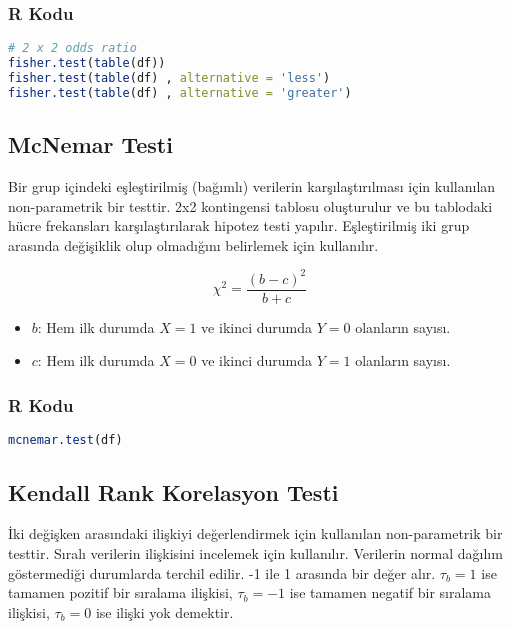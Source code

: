 \subsubsection{R Kodu}

\begin{lstlisting}[language=R]
# 2 x 2 odds ratio
fisher.test(table(df))
fisher.test(table(df) , alternative = 'less')
fisher.test(table(df) , alternative = 'greater')
\end{lstlisting}

\newpage

\subsection{McNemar Testi}
Bir grup içindeki eşleştirilmiş (bağımlı) verilerin karşılaştırılması için kullanılan non-parametrik bir testtir. 2x2 kontingensi tablosu oluşturulur ve bu tablodaki hücre frekansları karşılaştırılarak hipotez testi yapılır. Eşleştirilmiş iki grup arasında değişiklik olup olmadığını belirlemek için kullanılır.

\[ \chi^2 = \frac{(b - c)^2}{b + c} \]

\begin{itemize}
	\item $b$: Hem ilk durumda $X = 1$ ve ikinci durumda $Y = 0$ olanların sayısı.
	\item $c$: Hem ilk durumda $X = 0$ ve ikinci durumda $Y = 1$ olanların sayısı.
\end{itemize}

\subsubsection{R Kodu}

\begin{lstlisting}[language=R]
mcnemar.test(df)
\end{lstlisting}

\newpage

\subsection{Kendall Rank Korelasyon Testi}
İki değişken arasındaki ilişkiyi değerlendirmek için kullanılan non-parametrik bir testtir. Sıralı verilerin ilişkisini incelemek için kullanılır. Verilerin normal dağılım göstermediği durumlarda terchil edilir. -1 ile 1 arasında bir değer alır. $\tau_b = 1$ ise tamamen pozitif bir sıralama ilişkisi, $\tau_b = -1$ ise tamamen negatif bir sıralama ilişkisi, $\tau_b = 0$ ise ilişki yok demektir.

